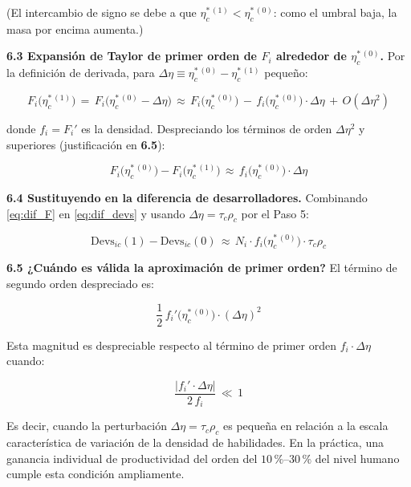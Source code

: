 \documentclass[11pt,a4paper]{article}
\theoremstyle{definition}
\begin{document}
(El intercambio de signo se debe a que $\eta_c^{*\,(1)} < \eta_c^{*\,(0)}$: como el umbral baja, la masa por encima aumenta.)

\textbf{6.3 Expansión de Taylor de primer orden de $F_i$ alrededor de $\eta_c^{*\,(0)}$.} Por la definición de derivada, para $\Delta\eta \equiv \eta_c^{*\,(0)} - \eta_c^{*\,(1)}$ pequeño:

\begin{equation}
F_i\!\bigl(\eta_c^{*\,(1)}\bigr) \,=\, F_i\!\bigl(\eta_c^{*\,(0)} - \Delta\eta\bigr) \,\approx\, F_i\!\bigl(\eta_c^{*\,(0)}\bigr) \,-\, f_i\!\bigl(\eta_c^{*\,(0)}\bigr)\cdot\Delta\eta \,+\, O(\Delta\eta^2)
\label{eq:taylor}
\end{equation}

donde $f_i = F_i'$ es la densidad. Despreciando los términos de orden $\Delta\eta^2$ y superiores (justificación en \textbf{6.5}):

\begin{equation}
F_i\!\bigl(\eta_c^{*\,(0)}\bigr) - F_i\!\bigl(\eta_c^{*\,(1)}\bigr) \,\approx\, f_i\!\bigl(\eta_c^{*\,(0)}\bigr)\cdot\Delta\eta
\label{eq:dif_F}
\end{equation}

\textbf{6.4 Sustituyendo en la diferencia de desarrolladores.} Combinando \eqref{eq:dif_F} en \eqref{eq:dif_devs} y usando $\Delta\eta = \tau_c\rho_c$ por el Paso 5:

\begin{equation}
\text{Devs}_{ic}(1) - \text{Devs}_{ic}(0) \,\approx\, N_i\cdot f_i\!\bigl(\eta_c^{*\,(0)}\bigr)\cdot \tau_c\rho_c
\label{eq:dif_aprox}
\end{equation}

\textbf{6.5 ¿Cuándo es válida la aproximación de primer orden?} El término de segundo orden despreciado es:

\[
\frac{1}{2}\,f_i'\!\bigl(\eta_c^{*\,(0)}\bigr)\cdot(\Delta\eta)^2
\]

Esta magnitud es despreciable respecto al término de primer orden $f_i\cdot\Delta\eta$ cuando:

\[
\frac{|f_i'\cdot\Delta\eta|}{2\,f_i} \,\ll\, 1
\]

Es decir, cuando la perturbación $\Delta\eta = \tau_c\rho_c$ es pequeña en relación a la escala característica de variación de la densidad de habilidades. En la práctica, una ganancia individual de productividad del orden del $10\,\%$--$30\,\%$ del nivel humano cumple esta condición ampliamente.
\end{document}
